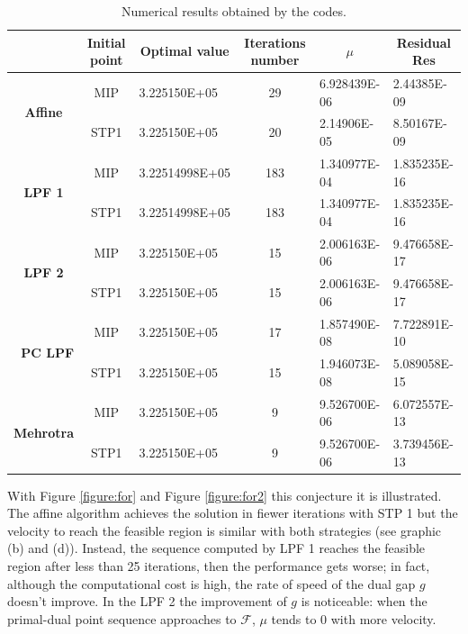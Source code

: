 \documentclass[a4paper,10 pt,titlepage,twoside]{book}
\theoremstyle{plain}
\theoremstyle{definition}
\theoremstyle{remark}
\begin{document}
{{\begin{table}[]\caption{\label{table:PNV}Numerical results obtained by the codes.}
	\begin{tabular}{cclcll}
		\hline		\textbf{} & \textbf{Initial point} & \multicolumn{1}{c}{\textbf{Optimal value}} & \textbf{Iterations number} & \multicolumn{1}{c}{\textbf{$\mu$}} & \multicolumn{1}{c}{\textbf{Residual} Res} \\ \hline
		\multicolumn{1}{c|}{\multirow{2}{*}{\textbf{Affine}}} & MIP & 3.225150E+05 & 29 & 6.928439E-06 & 2.44385E-09 \\
		\multicolumn{1}{c|}{} & STP1 & 3.225150E+05 & 20 & 2.14906E-05 & 8.50167E-09 \\ \hline
		\multicolumn{1}{c|}{\multirow{2}{*}{\textbf{LPF 1}}} & MIP & 3.22514998E+05 & 183 & 1.340977E-04 & 1.835235E-16 \\
		\multicolumn{1}{c|}{} & STP1 & 3.22514998E+05 & 183 & 1.340977E-04 & 1.835235E-16 \\ \hline
		\multicolumn{1}{c|}{\multirow{2}{*}{\textbf{LPF 2}}} & MIP & 3.225150E+05 & 15 & 2.006163E-06 & 9.476658E-17 \\
		\multicolumn{1}{c|}{} & STP1 & 3.225150E+05 & 15 & 2.006163E-06 & 9.476658E-17 \\ \hline
		\multicolumn{1}{r|}{\multirow{2}{*}{\textbf{PC LPF}}} & MIP & 3.225150E+05 & 17 & 1.857490E-08 & 7.722891E-10 \\
		\multicolumn{1}{r|}{} & STP1 & 3.225150E+05 & 15 & 1.946073E-08 & 5.089058E-15 \\ \hline
		\multicolumn{1}{c|}{\multirow{2}{*}{\textbf{Mehrotra}}} & MIP & 3.225150E+05 & 9 & 9.526700E-06 & 6.072557E-13 \\
		\multicolumn{1}{c|}{} & STP1 & 3.225150E+05 & 9 & 9.526700E-06 & 3.739456E-13 \\ \hline
	\end{tabular}
\end{table}
With Figure \ref{figure:for} and Figure \ref{figure:for2} this conjecture it is illustrated.\\ 
The affine algorithm achieves the solution in fiewer iterations with STP 1 but the velocity to reach the feasible region is similar with both strategies (see graphic (b) and (d)). Instead, the sequence computed by LPF 1 reaches the feasible region after less than 25 iterations, then the performance gets worse;  in fact, although the computational cost is high, the rate of speed of the dual gap $g$ doesn't improve.  
In the LPF 2 the improvement of $g$ is noticeable: when the primal-dual point sequence approaches to $\mathcal{F}$, $\mu$ tends to 0 with more velocity.\\ 
}}
\end{document}
